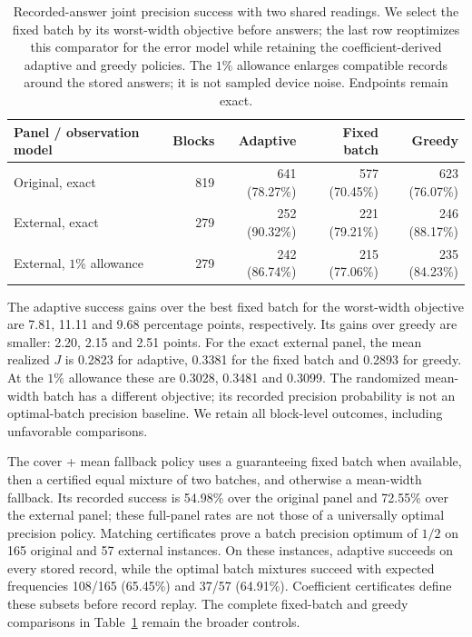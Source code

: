\documentclass[12pt]{article}
\begin{document}
\begin{table}[t]
\centering\small
\begin{tabular}{lrrrr}
\toprule
Panel / observation model & Blocks & Adaptive & Fixed batch & Greedy\\
\midrule
Original, exact &819&641 (78.27\%)&577 (70.45\%)&623 (76.07\%)\\
External, exact &279&252 (90.32\%)&221 (79.21\%)&246 (88.17\%)\\
External, $1\%$ allowance &279&242 (86.74\%)&215 (77.06\%)&235 (84.23\%)\\
\bottomrule
\end{tabular}
\caption{Recorded-answer joint precision success with two shared readings.
We select the fixed batch by its worst-width objective before answers;
the last row reoptimizes this comparator for the error model while retaining
the coefficient-derived adaptive and greedy policies. The $1\%$ allowance
enlarges compatible records around the stored answers; it is not sampled
device noise. Endpoints remain exact.}
\label{tab:joint_shared_replay}
\end{table}

The adaptive success gains over the best fixed batch for the worst-width objective are
7.81, 11.11 and 9.68 percentage points, respectively. Its gains over greedy
are smaller: 2.20, 2.15 and 2.51 points. For the exact external panel, the
mean realized $J$ is 0.2823 for adaptive, 0.3381 for the fixed batch and
0.2893 for greedy. At the $1\%$ allowance these are 0.3028, 0.3481 and
0.3099. The randomized mean-width batch has a different objective; its
recorded precision probability is not an optimal-batch precision baseline.
We retain all block-level outcomes, including unfavorable comparisons.

The cover + mean fallback policy uses a guaranteeing fixed batch when
available, then a certified equal mixture of two batches, and otherwise a
mean-width fallback.
Its recorded success is 54.98\% over the original panel and 72.55\% over the
external panel; these full-panel rates are not those of a universally optimal
precision policy. Matching certificates prove a batch precision optimum of
$1/2$ on 165 original and 57 external instances. On these instances, adaptive
succeeds on every stored record, while the optimal batch mixtures succeed
with expected frequencies 108/165 (65.45\%) and 37/57 (64.91\%). Coefficient
certificates define these subsets before record replay. The complete fixed-batch and greedy
comparisons in Table~\ref{tab:joint_shared_replay} remain the broader controls.
\end{document}
